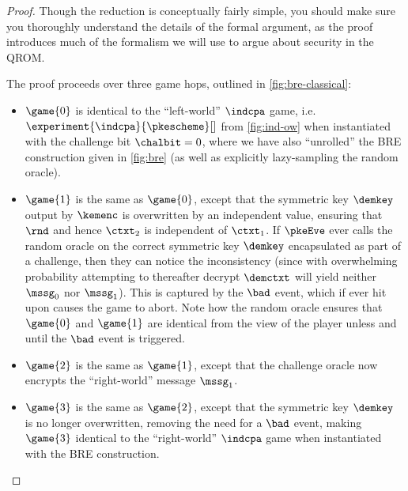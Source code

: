     \begin{proof}
      \iftutorial
      Though the reduction is conceptually fairly simple, you should
        make sure you thoroughly understand the details of the formal argument, 
        as the proof introduces much of the formalism we will 
        use to argue about security in the QROM.

      \fi
      The proof proceeds over three game hops, outlined in
        \cref{fig:bre-classical}: 
      \begin{itemize}
        \item $\game{0}$ is identical to the ``left-world'' $\indcpa$ game,
          i.e.\ $\experiment{\indcpa}{\pkescheme}[]$ from \cref{fig:ind-ow}
          when instantiated with the challenge bit $\chalbit = 0$, where we have
          also ``unrolled'' the BRE construction given in \cref{fig:bre} (as
          well as explicitly lazy-sampling the random oracle).
        \item $\game{1}$ is the same as $\game{0}$, except that the symmetric key
          $\demkey$ output by $\kemenc$ is overwritten by an independent value,
          ensuring that $\rnd$ and hence $\ctxt_2$ is independent of $\ctxt_1$.
          If $\pkeEve$ ever calls the random oracle on the correct symmetric key
          $\demkey$ encapsulated as part of a challenge, then they can notice
          the inconsistency (since with overwhelming probability attempting to
          thereafter decrypt $\demctxt$ will yield neither $\mssg_0$ nor
          $\mssg_1$). This is captured by the $\bad$ event, which if ever hit
          upon causes the game to abort. Note how the random oracle ensures that
          $\game{0}$ and $\game{1}$ are identical from the view of the player
          unless and until the $\bad$ event is triggered.
        \item $\game{2}$ is the same as $\game{1}$, except that the challenge oracle
          now encrypts the ``right-world'' message $\mssg_1$.
        \item $\game{3}$ is the same as $\game{2}$, except that the symmetric key
          $\demkey$ is no longer overwritten, removing the need for a $\bad$ event,
          making $\game{3}$ identical to the ``right-world'' $\indcpa$ game when
          instantiated with the BRE construction.
      \end{itemize}


\end{proof}
